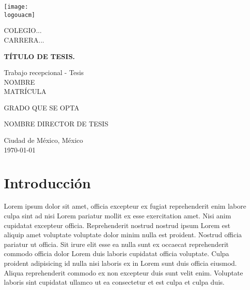 \documentclass[12pt,twoside,left5mm,doublespacing]{bookest}
\newcommand{\logouacm}{../assets/logouacm.png} %
\begin{document}

\begin{titlepage}
	\centering

	\texttt{[image: \\logouacm]}
	\par\vspace{0.5cm}
	\large{COLEGIO...} \\
	\large{CARRERA...}
	\par\vspace{0.5cm}
	\Large\textbf{TÍTULO DE TESIS.} \\
	\par\vspace{0.5cm}
	\large{Trabajo recepcional - Tesis} \\
	\Large{NOMBRE} \\
	\large{MATRÍCULA}
	\par\vspace{0.5cm}
	\large{GRADO QUE SE OPTA} \\
	\par\vspace{0.5cm}
	\large{NOMBRE DIRECTOR DE TESIS}
	\par\vspace{0.5cm}
	\large{Ciudad de México, México} \\
	\large{\today}

\end{titlepage}



\thispagestyle{empty} %

\tableofcontents %

\clearpage %
\thispagestyle{empty} %



\frontmatter
\chapter{Introducción}

Lorem ipsum dolor sit amet, officia excepteur ex fugiat reprehenderit enim labore culpa sint ad nisi Lorem pariatur mollit ex esse exercitation amet. Nisi anim cupidatat excepteur officia. Reprehenderit nostrud nostrud ipsum Lorem est aliquip amet voluptate voluptate dolor minim nulla est proident. Nostrud officia pariatur ut officia. Sit irure elit esse ea nulla sunt ex occaecat reprehenderit commodo officia dolor Lorem duis laboris cupidatat officia voluptate. Culpa proident adipisicing id nulla nisi laboris ex in Lorem sunt duis officia eiusmod. Aliqua reprehenderit commodo ex non excepteur duis sunt velit enim. Voluptate laboris sint cupidatat ullamco ut ea consectetur et est culpa et culpa duis.
\end{document}
